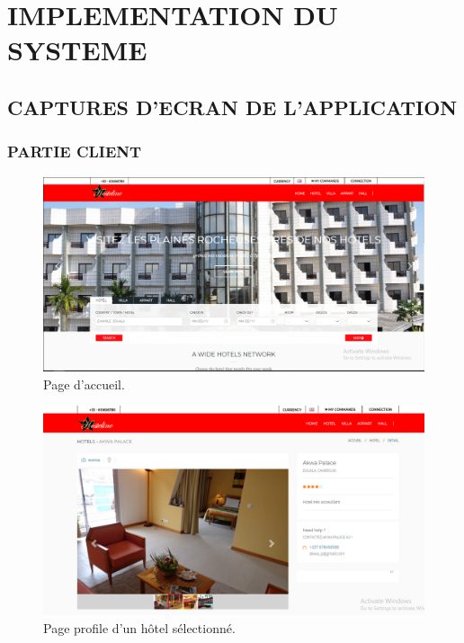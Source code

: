 \chapter{IMPLEMENTATION DU SYSTEME}

\section{CAPTURES D’ECRAN DE L’APPLICATION}

\subsection{PARTIE CLIENT}

 \begin{figure}[h]
	\begin{center}
		\includegraphics[scale=0.5]{images/home.png}
		\caption{Page d’accueil.}
		\label{synthese-cout-salarieyy}
	\end{center}
\end{figure}



\begin{figure}[h]
	\begin{center}
		\includegraphics[scale=0.5]{images/hotel_profile.png}
		\caption{Page profile d’un hôtel sélectionné.}
		\label{synthese-cout-salariett}
	\end{center}
\end{figure}
 
